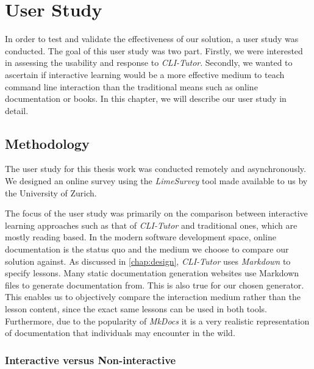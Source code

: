 \chapter{User Study}
\label{chap:userstudy}

In order to test and validate the effectiveness of our solution, a user study
was conducted. The goal of this user study was two part. Firstly, we were
interested in assessing the usability and response to \textit{CLI-Tutor}.
Secondly, we wanted to ascertain if interactive learning would be a more
effective medium to teach command line interaction than the traditional means
such as online documentation or books. In this chapter, we will describe our
user study in detail.

\section{Methodology}

The user study for this thesis work was conducted remotely and asynchronously.
We designed an online survey using the \textit{LimeSurvey}\cite{schmitzlime}
tool made available to us by the University of Zurich.

The focus of the user study was primarily on the comparison between interactive
learning approaches such as that of \textit{CLI-Tutor} and traditional ones,
which are mostly reading based. In the modern software development space,
online documentation is the status quo and the medium we choose to compare our
solution against. As discussed in \autoref{chap:design}, \textit{CLI-Tutor}
uses \textit{Markdown} to specify lessons. Many static documentation generation
websites use Markdown files to generate documentation from. This is also true
for our chosen generator. This enables us to objectively compare the
interaction medium rather than the lesson content, since the exact same lessons
can be used in both tools. Furthermore, due to the popularity of
\textit{MkDocs} it is a very realistic representation of documentation that
individuals may encounter in the wild.


\subsection{Interactive versus Non-interactive}

